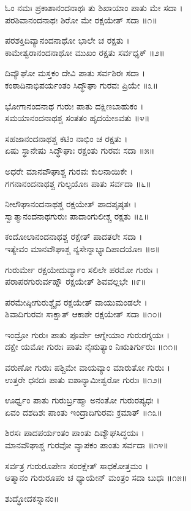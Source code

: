 ಓಂ ನಮಃ ಪ್ರಕಾಶಾನಂದನಾಥಃ ತು ಶಿಖಾಯಾಂ ಪಾತು ಮೇ ಸದಾ ।\\
ಪರಶಿವಾನಂದನಾಥಃ ಶಿರೋ ಮೇ ರಕ್ಷಯೇತ್ ಸದಾ ॥೧॥

ಪರಶಕ್ತಿದಿವ್ಯಾನಂದನಾಥೋ ಭಾಲೇ ಚ ರಕ್ಷತು ।\\
ಕಾಮೇಶ್ವರಾನಂದನಾಥೋ ಮುಖಂ ರಕ್ಷತು ಸರ್ವಧೃಕ್ ॥೨॥

ದಿವ್ಯೌಘೋ ಮಸ್ತಕಂ ದೇವಿ ಪಾತು ಸರ್ವಶಿರಃ ಸದಾ ।\\
ಕಂಠಾದಿನಾಭಿಪರ್ಯಂತಂ ಸಿದ್ಧೌಘಾ ಗುರವಃ ಪ್ರಿಯೇ ॥೩॥

ಭೋಗಾನಂದನಾಥ ಗುರುಃ ಪಾತು ದಕ್ಷಿಣಬಾಹುಕಂ ।\\
ಸಮಯಾನಂದನಾಥಶ್ಚ ಸಂತತಂ ಹೃದಯೇಽವತು ॥೪॥

ಸಹಜಾನಂದನಾಥಶ್ಚ ಕಟಿಂ ನಾಭಿಂ ಚ ರಕ್ಷತು ।\\
ಏಷು ಸ್ಥಾನೇಷು ಸಿದ್ಧೌಘಾಃ ರಕ್ಷಂತು ಗುರವಃ ಸದಾ ॥೫॥

ಅಧರೇ ಮಾನವೌಘಾಶ್ಚ ಗುರವಃ ಕುಲನಾಯಿಕೇ ।\\
ಗಗನಾನಂದನಾಥಶ್ಚ ಗುಲ್ಫಯೋಃ ಪಾತು ಸರ್ವದಾ ॥೬॥

ನೀಲೌಘಾನಂದನಾಥಶ್ಚ ರಕ್ಷಯೇತ್ ಪಾದಪೃಷ್ಠತಃ ।\\
ಸ್ವಾತ್ಮಾನಂದನಾಥಗುರುಃ ಪಾದಾಂಗುಲೀಶ್ಚ ರಕ್ಷತು ॥೭॥

ಕಂದೋಲಾನಂದನಾಥಶ್ಚ ರಕ್ಷೇತ್ ಪಾದತಲೇ ಸದಾ ।\\
ಇತ್ಯೇವಂ ಮಾನವೌಘಾಶ್ಚ ನ್ಯಸೇನ್ನಾಭ್ಯಾದಿಪಾದಯೋಃ ॥೮॥

ಗುರುರ್ಮೇ ರಕ್ಷಯೇದುರ್ವ್ಯಾಂ ಸಲಿಲೇ ಪರಮೋ ಗುರುಃ ।\\
ಪರಾಪರಗುರುರ್ವಹ್ನೌ ರಕ್ಷಯೇತ್ ಶಿವವಲ್ಲಭೇ ॥೯॥

ಪರಮೇಷ್ಠೀಗುರುಶ್ಚೈವ ರಕ್ಷಯೇತ್ ವಾಯುಮಂಡಲೇ ।\\
ಶಿವಾದಿಗುರವಃ ಸಾಕ್ಷಾತ್ ಆಕಾಶೇ ರಕ್ಷಯೇತ್ ಸದಾ ॥೧೦॥

ಇಂದ್ರೋ ಗುರುಃ ಪಾತು ಪೂರ್ವೇ ಆಗ್ನೇಯಾಂ ಗುರುರಗ್ನಯಃ ।\\
ದಕ್ಷೇ ಯಮೋ ಗುರುಃ ಪಾತು ನೈಋತ್ಯಾಂ ನಿಋತಿರ್ಗುರುಃ ॥೧೧॥

ವರುಣೋ ಗುರುಃ ಪಶ್ಚಿಮೇ ವಾಯವ್ಯಾಂ ಮಾರುತೋ ಗುರುಃ ।\\
ಉತ್ತರೇ ಧನದಃ ಪಾತು ಐಶಾನ್ಯಾಮೀಶ್ವರೋ ಗುರುಃ ॥೧೨॥

ಊರ್ಧ್ವಂ ಪಾತು ಗುರುರ್ಬ್ರಹ್ಮಾ ಅನಂತೋ ಗುರುರಪ್ಯಧಃ ।\\
ಏವಂ ದಶದಿಶಃ ಪಾಂತು ಇಂದ್ರಾದಿಗುರವಃ ಕ್ರಮಾತ್ ॥೧೩॥

ಶಿರಸಃ ಪಾದಪರ್ಯಂತಂ ಪಾಂತು ದಿವ್ಯೌಘಸಿದ್ಧಯಃ ।\\
ಮಾನವೌಘಾಶ್ಚ ಗುರವೋ ವ್ಯಾಪಕಂ ಪಾಂತು ಸರ್ವದಾ ॥೧೪॥

ಸರ್ವತ್ರ ಗುರುರೂಪೇಣ ಸಂರಕ್ಷೇತ್ ಸಾಧಕೋತ್ತಮಂ ।\\
ಆತ್ಮಾನಂ ಗುರುರೂಪಂ ಚ ಧ್ಯಾಯೇನ್ ಮಂತ್ರಂ ಸದಾ ಬುಧಃ ॥೧೫॥

ಶುದ್ಧೋದಕಸ್ನಾನಂ॥

